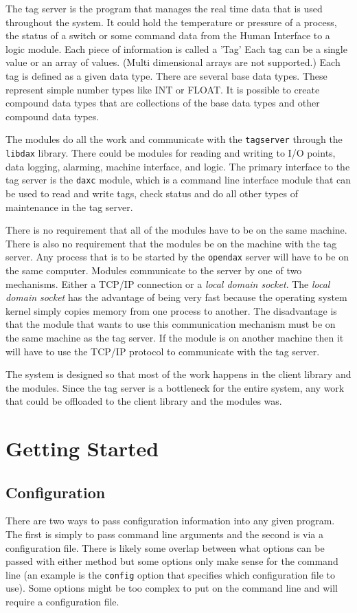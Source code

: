 	The tag server is the program that manages the real time data that is used
	throughout the system.  It could hold the temperature or pressure of a process,
	the status of a switch or some command data from the Human Interface to a logic
	module.  Each piece of information is called a 'Tag'  Each tag can be a single
	value or an array of values.  (Multi dimensional arrays are not supported.)
	Each tag is defined as a given data type.  There are several base data types.
	These represent simple number types like INT or FLOAT.  It is possible to create
	compound
	data types that are collections of the base data types and other compound data
	types.

	The modules do all the work and communicate with the \texttt{tagserver} through
	the \texttt{libdax} library. There could be modules for reading and writing to
	I/O points, data logging, alarming, machine interface, and logic. The primary
	interface to the tag server is the \texttt{daxc} module, which is a command line
	interface module that can
	be used to read and write tags, check status and do all other types of
	maintenance in the tag server.

	There is no requirement that all of the modules have to be on the same machine.
	There is also no requirement that the modules be on the machine with the tag
	server.  Any process that is to be started by the \texttt{opendax} server will
	have to be on the same computer.  Modules communicate to the server by one of
	two mechanisms.  Either a TCP/IP connection or a \textit{local domain socket}.
	The \textit{local domain socket} has the advantage of being very fast because
	the operating system kernel simply copies memory from one process to another.
	The disadvantage is that the module that wants to use this communication
	mechanism must be on the same machine as the tag server. If the module is on
	another machine then it will have to use the TCP/IP protocol to communicate with
	the tag server.

	The system is designed so that most of the work happens in the client library
	and the modules.  Since the tag
	server is a bottleneck for the entire system, any work that could be offloaded
	to the client library and the
	modules was.

	\chapter{Getting Started}
	

	\section{Configuration}
	There are two ways to pass configuration information into any given \opendax
	program.  The first is simply to pass command line arguments and the second is
	via a configuration file.  There is likely some overlap between what options can
	be passed with either method but some options only make sense for the command
	line (an example is the \texttt{config} option that specifies which
	configuration file to use).  Some options might be too complex to put on the
	command line and will require a configuration file.

